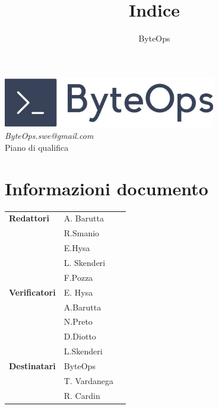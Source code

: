 \documentclass{article}
\title{\textbf{\fontsize{28}{6}\selectfont Indice}}
\author{\fontsize{14}{6}\selectfont ByteOps}
\date{}
\begin{document}
\pagestyle{fancy}
\begin{center}
    \includegraphics[width = 0.7\textwidth]{../Images/logo.png} \\
    \vspace{0.2cm}
    \textcolor[RGB]{60, 60, 60}{\textit{ByteOps.swe@gmail.com}} \\
    \vspace{2cm}
    \fontsize{16}{6}\selectfont Piano di qualifica \\
    \vspace{0.5cm}
\end{center}

\section*{Informazioni documento}
\def\arraystretch{1.2}
\begin{tabular}{>{\raggedleft\arraybackslash}p{}|>{\raggedright\arraybackslash}p{}c}
    \hline
    \addlinespace 
    \textbf{Redattori}    & A. Barutta\\ & R.Smanio\\ & E.Hysa\\ & L. Skenderi\\ & F.Pozza \vspace{10pt} \\
    \textbf{Verificatori} & E. Hysa\\ & A.Barutta\\ & N.Preto\\ & D.Diotto\\ & L.Skenderi \vspace{10pt} \\
    \textbf{Destinatari}  & ByteOps\\ & T. Vardanega   \\ & R. Cardin \vspace{10pt} \\
\end{tabular}
\pagebreak 

\end{document}
